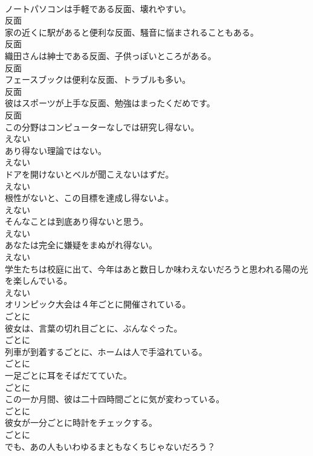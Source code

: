 \documentclass[8pt]{extreport}
\begin{document}
\begin{CJK}{UTF8}{min}
\\	ノートパソコンは手軽である反面、壊れやすい。	
\\	反面
\\	家の近くに駅があると便利な反面、騒音に悩まされることもある。	
\\	反面
\\	織田さんは紳士である反面、子供っぽいところがある。	
\\	反面
\\	フェースブックは便利な反面、トラブルも多い。	
\\	反面
\\	彼はスポーツが上手な反面、勉強はまったくだめです。	
\\	反面
\\	この分野はコンピューターなしでは研究し得ない。	
\\	えない
\\	あり得ない理論ではない。	
\\	えない
\\	ドアを開けないとベルが聞こえないはずだ。	
\\	えない
\\	根性がないと、この目標を達成し得ないよ。	
\\	えない
\\	そんなことは到底あり得ないと思う。	
\\	えない
\\	あなたは完全に嫌疑をまぬがれ得ない。	
\\	えない
\\	学生たちは校庭に出て、今年はあと数日しか味わえないだろうと思われる陽の光を楽しんでいる。	
\\	えない
\\	オリンピック大会は４年ごとに開催されている。	
\\	ごとに
\\	彼女は、言葉の切れ目ごとに、ぶんなぐった。	
\\	ごとに
\\	列車が到着するごとに、ホームは人で手溢れている。	
\\	ごとに
\\	一足ごとに耳をそばだてていた。	
\\	ごとに
\\	この一か月間、彼は二十四時間ごとに気が変わっている。	
\\	ごとに
\\	彼女が一分ごとに時計をチェックする。	
\\	ごとに
\\	でも、あの人もいわゆるまともなくちじゃないだろう？	

\end{CJK}
\end{document}
